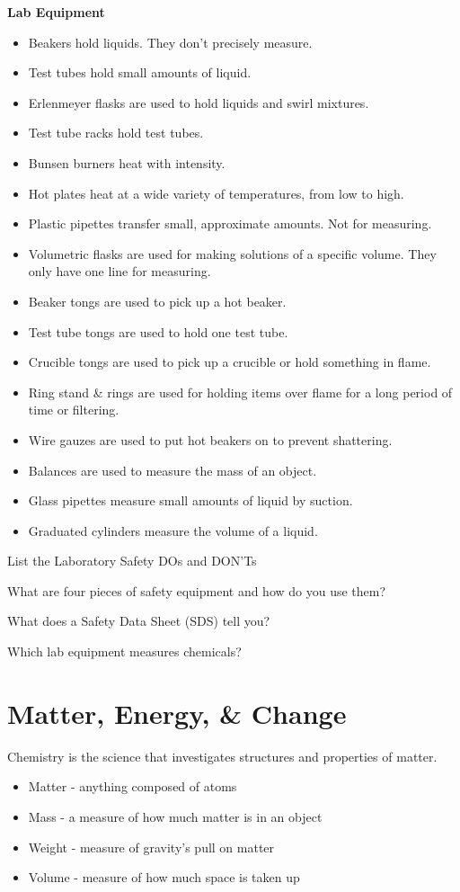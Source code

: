 \documentclass[../hchem.tex]{subfiles}
\begin{document}
\textbf{Lab Equipment} 
\begin{itemize}
    \item Beakers hold liquids. They don't precisely measure.
    \item Test tubes hold small amounts of liquid.
    \item Erlenmeyer flasks are used to hold liquids and swirl mixtures.
    \item Test tube racks hold test tubes.
    \item Bunsen burners heat with intensity.
    \item Hot plates heat at a wide variety of temperatures, from low to high.
    \item Plastic pipettes transfer small, approximate amounts. Not for measuring.
    \item Volumetric flasks are used for making solutions of a specific volume. They only have one line for measuring.
    \item Beaker tongs are used to pick up a hot beaker.
    \item Test tube tongs are used to hold one test tube.
    \item Crucible tongs are used to pick up a crucible or hold something in flame.
    \item Ring stand \& rings are used for holding items over flame for a long period of time or filtering.
    \item Wire gauzes are used to put hot beakers on to prevent shattering.
    \item Balances are used to measure the mass of an object.
    \item Glass pipettes measure small amounts of liquid by suction.
    \item Graduated cylinders measure the volume of a liquid.
\end{itemize}

\ex List the Laboratory Safety DOs and DON'Ts 

\ex What are four pieces of safety equipment and how do you use them?

\ex What does a Safety Data Sheet (SDS) tell you?

\ex Which lab equipment measures chemicals?

\section{Matter, Energy, \& Change}
Chemistry is the science that investigates structures and properties of matter.
\begin{itemize}
    \item Matter - anything composed of atoms
    \item Mass - a measure of how much matter is in an object 
    \item Weight - measure of gravity's pull on matter 
    \item Volume - measure of how much space is taken up
\end{itemize}
\end{document}
